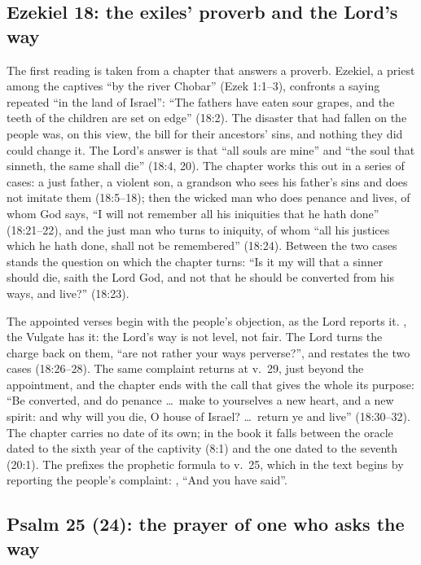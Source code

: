 \subsection{Ezekiel 18: the exiles' proverb and the Lord's way}

The first reading is taken from a chapter that answers a proverb. Ezekiel, a
priest among the captives ``by the river Chobar'' (Ezek 1:1--3), confronts a
saying repeated ``in the land of Israel'': ``The fathers have eaten sour
grapes, and the teeth of the children are set on edge'' (18:2). The disaster
that had fallen on the people was, on this view, the bill for their ancestors'
sins, and nothing they did could change it.
The Lord's answer is that ``all souls are mine'' and ``the soul that sinneth,
the same shall die'' (18:4, 20). The chapter works this out in a series of
cases: a just father, a violent son, a grandson who sees his father's sins and
does not imitate them (18:5--18); then the wicked man who does penance and
lives, of whom God says, ``I will not remember all his iniquities that he hath
done'' (18:21--22), and the just man who turns to iniquity, of whom ``all his
justices which he hath done, shall not be remembered'' (18:24). Between the
two cases stands the question on which the chapter turns: ``Is it my will that
a sinner should die, saith the Lord God, and not that he should be converted
from his ways, and live?'' (18:23).

The appointed verses begin with the people's objection, as the Lord reports
it. , the Vulgate has it: the Lord's way is not level, not fair. The
Lord turns the charge back on them, ``are not rather your ways perverse?'', and
restates the two cases (18:26--28). The same complaint returns at v.~29, just
beyond the appointment, and the chapter ends with the call that gives the whole
its purpose: ``Be converted, and do penance \ldots\ make to yourselves a new
heart, and a new spirit: and why will you die, O house of Israel? \ldots\ return
ye and live'' (18:30--32). The chapter carries no date of its own; in the book
it falls between the oracle dated to the sixth year of the captivity (8:1) and
the one dated to the seventh (20:1). The  prefixes the prophetic
formula  to v.~25, which in the text begins by
reporting the people's complaint: , ``And you have said''.

\subsection{Psalm 25 (24): the prayer of one who asks the way}


